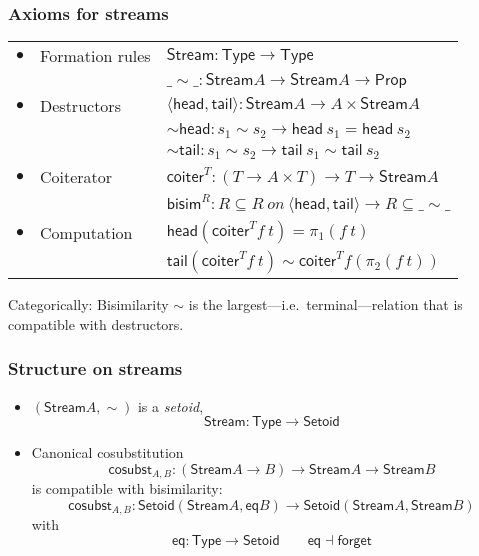\documentclass[
]
{beamer}
\newcommand{\constfont}[1]{\ensuremath{\mathsf{#1}}}
\newcommand{\stream}{\constfont{Stream}}
\newcommand{\head}{\constfont{top}}
\newcommand{\tail}{\constfont{rest}}
\newcommand{\shead}{\constfont{head}}
\newcommand{\stail}{\constfont{tail}}
\newcommand{\cosubst}{\constfont{cosubst}}
\newcommand{\bisim}{\constfont{bisim}}
\newcommand{\Setoid}{\constfont{Setoid}}
\newcommand{\eq}{\ensuremath{\mathsf{eq}}}
\newcommand{\coiter}{\constfont{coiter}}
\newcommand{\ibisim}{\ensuremath{\_\sim\_}}
\newcommand{\hbisim}{\ensuremath{\sim\!\constfont{head}}}
\newcommand{\tbisim}{\ensuremath{\sim\!\constfont{tail}}}
\newcommand{\Prop}{\constfont{Prop}}
\newcommand{\Type}{\constfont{Type}}
\newcommand{\Set}{\constfont{Type}}
\begin{document}
\begin{frame}
  \frametitle{Axioms for streams}
  \begin{tabular}{lll}
	  $\bullet$ & Formation rules & $\stream : \Type \to \Type $ \\
			   &                 & $\ibisim : \stream A \to \stream A \to \Prop $ \\[.75em]
	  $\bullet$ & Destructors     & $\langle \shead , \stail \rangle : \stream A \to A \times \stream A $ \\
	          &                 & $\hbisim : s_1 \sim s_2 \to \shead\ s_1 = \shead\ s_2 $ \\
			 &                 & $\tbisim : s_1 \sim s_2 \to \stail\ s_1 \sim \stail\ s_2 $ \\[.75em]
       $\bullet$  & Coiterator      & $\coiter^T : (T \to A \times T) \to T \to \stream A$ \\
				       &                 & $\bisim^R : R \subseteq R\ on\ \langle \shead , \stail \rangle \to R \subseteq \ibisim $ \\[.75em]
	  $\bullet$   & Computation     & $\shead (\coiter^T f\ t) = \pi_1 (f\ t)$ \\
				    &                 &  $\stail (\coiter^T f\ t) \sim \coiter^T f (\pi_2 (f\ t))$
  \end{tabular}
  \vspace{0.5em}
  \pause
  
  Categorically: Bisimilarity $\sim$ is the largest---i.e.\ terminal---relation that is compatible with destructors.
  
\end{frame}


\begin{frame}
 \frametitle{Structure on streams}
  
  \begin{itemize}\setlength{\itemsep}{1em}
   \item $(\stream A, \sim)$ is a \emph{setoid}, \[\stream : \Set \to \Setoid\]
   \item Canonical cosubstitution
          \[ \cosubst_{A,B}: (\stream A \to B) \to \stream A \to \stream B \]
         is compatible with bisimilarity:
          \[ \cosubst_{A,B}: \Setoid(\stream A , \eq B) \to \Setoid(\stream A , \stream B) \]
         with
         \[ \eq : \Set \to \Setoid  \qquad \eq \dashv \constfont{forget}\]         
  \end{itemize}
\end{frame}
\end{document}
